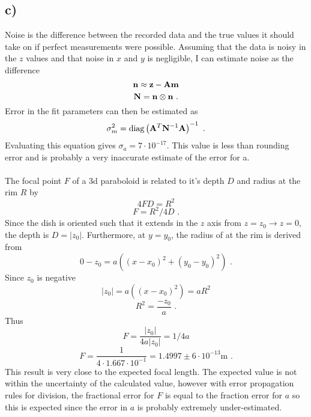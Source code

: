 \documentclass{article}
\newcommand{\<}[1]{\left\langle #1 \right\rangle }
\begin{document}
\subsection{c)}
Noise is the difference between the recorded data and the true values it should take on if perfect measurements were possible. Assuming that the data is noisy in the $z$ values and that noise in $x$ and $y$ is negligible, I can estimate noise as the difference 
\[\vb{n} \approx \vb{z} - \vb{A}\vb{m} \]
\[\vb{N} = \vb{n}\otimes \vb{n} \text{ .}\]
Error in the fit parameters can then be estimated as 
\[\sigma_m^2 = \text{diag} \left( \vb{A}^T\vb{N}^{-1}\vb{A} \right)^{-1} \text{ .} \]
Evaluating this equation gives $\sigma_a = 7\cdot 10^{-17}$. This value is less than rounding error and is probably a very inaccurate estimate of the error for a.\\
\\
The focal point $F$ of a 3d paraboloid is related to it's depth $D$ and radius at the rim $R$ by
\[4FD = R^2\]
\[F = R^2/4D \text{ .}\]
Since the dish is oriented such that it extends in the $z$ axis from $z = z_0 \to z=0$, the depth is $D=|z_0|$. Furthermore, at $y=y_0$, the radius of at the rim is derived from
\[ 0-z_0 = a\left( (x-x_0)^2 + (y_0 - y_0)^2 \right) \text{ .}\]
Since $z_0$ is negative
\[ |z_0| = a\left( (x-x_0)^2 \right) = aR^2 \]
\[R^2 = \frac{-z_0}{a} \text{ .}\]
Thus
\[ F =  \frac{|z_0|}{4a|z_0|} = 1/4a \]
\[\boxed{ F = \frac{1}{4\cdot 1.667\cdot10^{-1}} = 1.4997 \pm 6\cdot10^{-13} \text{m} }\text{ .}\]
This result is very close to the expected focal length. The expected value is not within the uncertainty of the calculated value, however with error propagation rules for division, the fractional error for $F$ is equal to the fraction error for $a$ so this is expected since the error in $a$ is probably extremely under-estimated.
\end{document}
